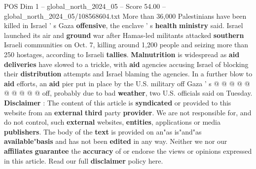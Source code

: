 \begin{textsample}{POS Dim 1 – global\_north\_2024\_05 – Score 54.00 – global\_north\_2024\_05/108568604.txt}
More than 36,000 Palestinians have been killed in Israel ' s Gaza \textbf{offensive}, the enclave ' s \textbf{health} \textbf{ministry} said.
Israel launched its air and \textbf{ground} war after Hamas-led militants attacked \textbf{southern} Israeli communities on Oct. 7, killing around 1,200 people and seizing more than 250 hostages, according to Israeli \textbf{tallies}. \textbf{Malnutrition} is widespread as \textbf{aid} \textbf{deliveries} have slowed to a trickle, with \textbf{aid} agencies accusing Israel of blocking their \textbf{distribution} attempts and Israel blaming the agencies.
In a further blow to \textbf{aid} efforts, an \textbf{aid} pier put in place by the U.S. military off Gaza ' s @ @ @ @ @ @ @ @ @ @ off, probably due to bad \textbf{weather}, two U.S. officials said on Tuesday. \textbf{Disclaimer} : The content of this article is \textbf{syndicated} or provided to this website from an \textbf{external} \textbf{third} party \textbf{provider}.
We are not responsible for, and do not control, such \textbf{external} websites, \textbf{entities}, applications or media \textbf{publishers}.
The body of the \textbf{text} is provided on an"as is"and"as \textbf{available}"\textbf{basis} and has not been \textbf{edited} in any way.
Neither we nor our \textbf{affiliates} \textbf{guarantee} the \textbf{accuracy} of or endorse the views or opinions expressed in this article.
Read our full \textbf{disclaimer} policy here.

\end{textsample}
